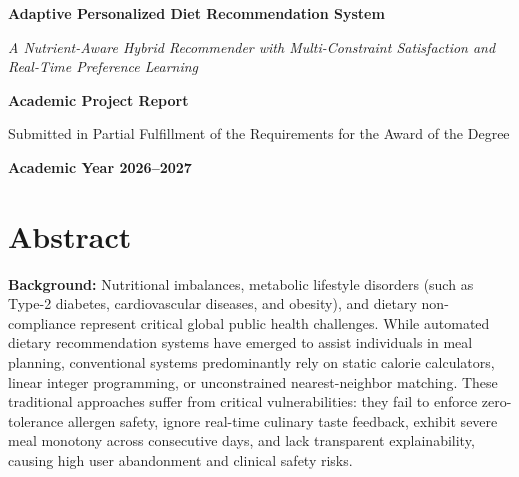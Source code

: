 \documentclass[12pt,a4paper]{report}
\begin{document}
\begin{titlepage}
    \centering
    \vspace*{1.5cm}
    
    {\Huge \bfseries Adaptive Personalized Diet Recommendation System \par}
    \vspace{0.6cm}
    {\Large \itshape A Nutrient-Aware Hybrid Recommender with Multi-Constraint Satisfaction and Real-Time Preference Learning \par}
    
    \vspace{2.5cm}
    
    {\large \bfseries Academic Project Report \par}
    \vspace{0.4cm}
    {\large Submitted in Partial Fulfillment of the Requirements for the Award of the Degree \par}
    
    \vspace{3.5cm}
    
    \vfill
    
    {\large \textbf{Academic Year 2026--2027} \par}
\end{titlepage}

\chapter*{Abstract}

\noindent\textbf{Background:} Nutritional imbalances, metabolic lifestyle disorders (such as Type-2 diabetes, cardiovascular diseases, and obesity), and dietary non-compliance represent critical global public health challenges. While automated dietary recommendation systems have emerged to assist individuals in meal planning, conventional systems predominantly rely on static calorie calculators, linear integer programming, or unconstrained nearest-neighbor matching. These traditional approaches suffer from critical vulnerabilities: they fail to enforce zero-tolerance allergen safety, ignore real-time culinary taste feedback, exhibit severe meal monotony across consecutive days, and lack transparent explainability, causing high user abandonment and clinical safety risks.
\end{document}
